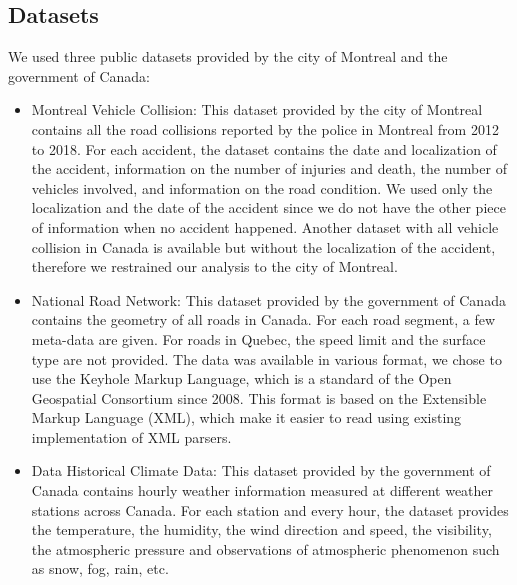 \documentclass[conference]{IEEEtran}
\begin{document}
\subsection{Datasets}
We used three public datasets provided by the city of Montreal and the government of Canada: 
\begin{itemize}
\item Montreal Vehicle Collision: This dataset provided by the city of Montreal contains all the road collisions reported by the police in Montreal from 2012 to 2018.
For each accident, the dataset contains the date and localization of the accident, information on the number of injuries and death, the number of vehicles involved, and information on the road condition.
We used only the localization and the date of the accident since we do not have the other piece of information when no accident happened.
Another dataset with all vehicle collision in Canada is available but without the localization of the accident, therefore we restrained our analysis to the city of Montreal.
\item National Road Network: This dataset provided by the government of Canada contains the geometry of all roads in Canada.
For each road segment, a few meta-data are given.
For roads in Quebec, the speed limit and the surface type are not provided.
The data was available in various format, we chose to use the Keyhole Markup Language, which is a standard of the Open Geospatial Consortium since 2008.
This format is based on the Extensible Markup Language (XML), which make it easier to read using existing implementation of XML parsers.

\item Data Historical Climate Data: This dataset provided by the government of Canada contains hourly weather information measured at different weather stations across Canada.
For each station and every hour, the dataset provides the temperature, the humidity, the wind direction and speed, the visibility, the atmospheric pressure and observations of atmospheric phenomenon such as snow, fog, rain, etc.
\end{itemize}
\end{document}
